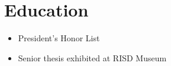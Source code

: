 
\section{Education}




\begin{itemize}

  \item President's Honor List

  \item Senior thesis exhibited at RISD Museum

\end{itemize}




